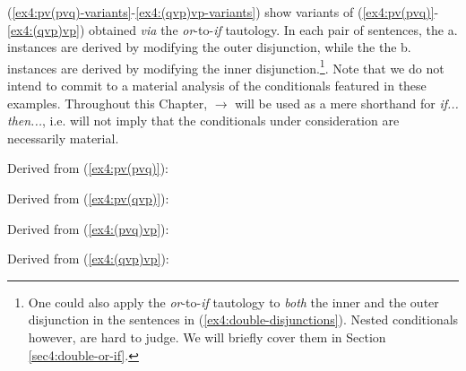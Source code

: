 (\ref{ex4:pv(pvq)-variants}-\ref{ex4:(qvp)vp-variants}) show variants of (\ref{ex4:pv(pvq)}-\ref{ex4:(qvp)vp}) obtained \textit{via} the \textit{or}-to-\textit{if} tautology. In each pair of sentences, the a. instances are derived by modifying the outer disjunction, while the the b. instances are derived by modifying the inner disjunction.\footnote{One could also apply the \textit{or}-to-\textit{if} tautology to \textit{both} the inner and the outer disjunction in the sentences in (\ref{ex4:double-disjunctions}). Nested conditionals however, are hard to judge. We will briefly cover them in Section \ref{sec4:double-or-if}.}. Note that we do not intend to commit to a material analysis of the conditionals featured in these examples. Throughout this Chapter, $\rightarrow$ will be used as a mere shorthand for \textit{if... then...}, i.e. will not imply that the conditionals under consideration are necessarily material.\\


\begin{exe}
	\ex Derived from (\ref{ex4:pv(pvq)}):
	\begin{xlist}
		\label{ex4:npt(pvq)}
		\label{ex4:pv(nptq)}
	\end{xlist}\label{ex4:pv(pvq)-variants}
	\ex Derived from (\ref{ex4:pv(qvp)}):
	\begin{xlist}
		\label{ex4:npt(qvp)}
		\label{ex4:pv(nqtp)}
	\end{xlist}\label{ex4:pv(qvp)-variants}
	\ex Derived from (\ref{ex4:(pvq)vp}):
	\begin{xlist}
		\label{ex4:n(pvq)tp}
		\label{ex4:(nptq)vp}
	\end{xlist}\label{ex4:(pvq)vp-variants}
	\ex Derived from (\ref{ex4:(qvp)vp}):
	\begin{xlist}
		\label{ex4:n(qvp)tp}
		\label{ex4:(nqtp)vp}
	\end{xlist}\label{ex4:(qvp)vp-variants}
\end{exe} 

